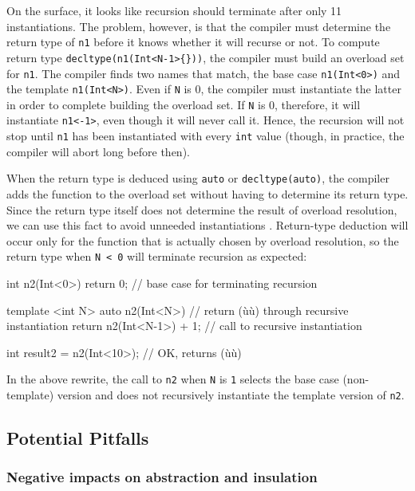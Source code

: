 \noindent On the surface, it looks like recursion should terminate after only 11
instantiations. The problem, however, is that the compiler must
determine the return type of \lstinline!n1! before it knows whether it will
recurse or not. To compute return type
\lstinline!decltype(n1(Int<N-1>{}))!, the compiler must build an overload
set for \lstinline!n1!. The compiler finds two names that match, the base
case \lstinline!n1(Int<0>)! and the template \lstinline!n1(Int<N>)!. Even if
\lstinline!N! is 0, the compiler must instantiate the latter in order to
complete building the overload set. If \lstinline!N! is 0, therefore, it
will instantiate \lstinline!n1<-1>!, even though it will never call it.
Hence, the recursion will not stop until \lstinline!n1! has been
instantiated with every \lstinline!int! value (though, in practice, the
compiler will abort long before then).

When the return type is deduced using \lstinline!auto! or
\lstinline!decltype(auto)!, the compiler adds the function to the overload
set without having to determine its return type. Since the return type
itself does not determine the result of overload resolution, we can use
this fact to avoid unneeded instantiations . Return-type deduction will
occur only for the function that is actually chosen by overload
resolution, so the return type when \lstinline!N!~\lstinline!<!~\lstinline!0!
will terminate recursion as expected:

\begin{emcppslisting}
int n2(Int<0>) { return 0; }     // base case for terminating recursion

template <int N>
auto n2(Int<N>)
    // return (ù{}ù) through recursive instantiation
{
    return n2(Int<N-1>{}) + 1;   // call to recursive instantiation
}

int result2 = n2(Int<10>{});     // OK, returns (ù{}ù)
\end{emcppslisting}
    

\noindent In the above rewrite, the call to \lstinline!n2! when \lstinline!N! is
\lstinline!1! selects the base case (non-template) version and does not
recursively instantiate the template version of \lstinline!n2!.

\subsection[Potential Pitfalls]{Potential Pitfalls}\label{potential-pitfalls}

\subsubsection[Negative impacts on abstraction and insulation]{Negative impacts on abstraction and insulation}\label{negative-impacts-on-abstraction-and-insulation}

